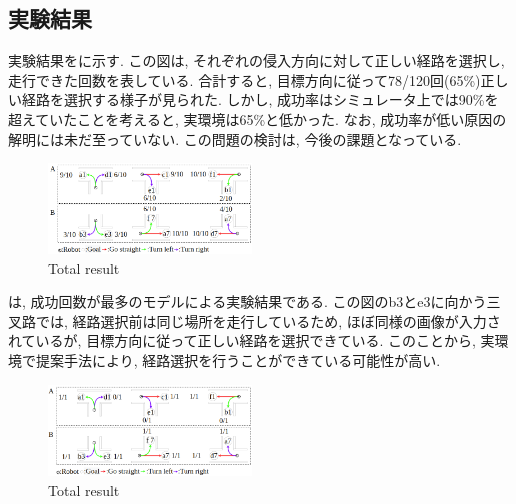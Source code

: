 \documentclass[10pt]{jarticle}
\begin{document}
    \subsection{実験結果}   
    実験結果をに示す. この図は, それぞれの侵入方向に対して正しい経路を選択し, 走行できた回数を表している. 合計すると, 目標方向に従って78/120回(65\%)正しい経路を選択する様子が見られた. しかし, 成功率はシミュレータ上では90\%を超えていたことを考えると, 実環境は65\%と低かった. なお, 成功率が低い原因の解明には未だ至っていない. この問題の検討は, 今後の課題となっている.
    \begin{center}
        \begin{figure}[h]
            \centering
            \includegraphics[width=0.48\textwidth]{./fig/real_result.png}
            \caption{Total result}
            \label{fig:result1}
        \end{figure}
    \end{center}
    \vspace{-0.9cm}
    は, 成功回数が最多のモデルによる実験結果である. この図のb3とe3に向かう三叉路では, 経路選択前は同じ場所を走行しているため, ほぼ同様の画像が入力されているが, 目標方向に従って正しい経路を選択できている. このことから, 実環境で提案手法により, 経路選択を行うことができている可能性が高い. 
    \vspace{-0.2cm}
    
    \begin{center}
        \begin{figure}[h]
            \centering
            \includegraphics[width=0.48\textwidth]{./fig/real_model3.png}
            \caption{Total result}
            \label{fig:result2}
        \end{figure}
    \end{center}

    \vspace{-1.0cm}
\end{document}
